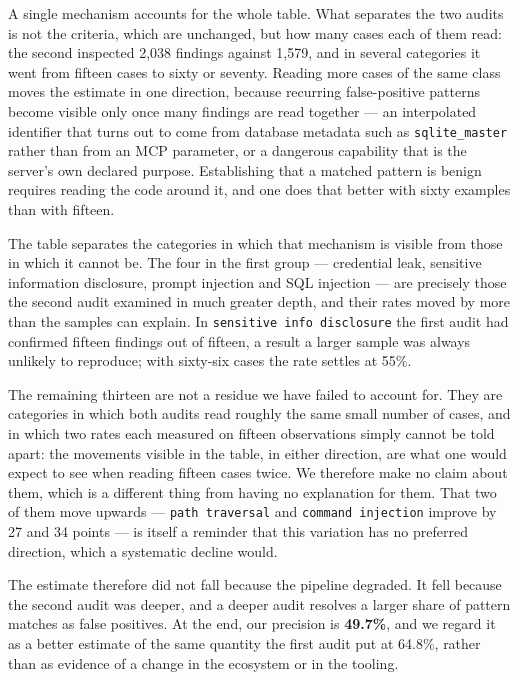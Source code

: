 A single mechanism accounts for the whole table. What separates the two audits is
not the criteria, which are unchanged, but how many cases each of them read: the
second inspected 2,038 findings against 1,579, and in several categories it went
from fifteen cases to sixty or seventy. Reading more cases of the same class moves
the estimate in one direction, because recurring false-positive patterns become
visible only once many findings are read together --- an interpolated identifier
that turns out to come from database metadata such as \texttt{sqlite\_master}
rather than from an MCP parameter, or a dangerous capability that is the server's
own declared purpose. Establishing that a matched pattern is benign requires
reading the code around it, and one does that better with sixty examples than with
fifteen.

The table separates the categories in which that mechanism is visible from those
in which it cannot be. The four in the first group --- credential leak, sensitive
information disclosure, prompt injection and SQL injection --- are precisely those
the second audit examined in much greater depth, and their rates moved by more
than the samples can explain. In \texttt{sensitive info disclosure} the first audit
had confirmed fifteen findings out of fifteen, a result a larger sample was always
unlikely to reproduce; with sixty-six cases the rate settles at 55\%.

The remaining thirteen are not a residue we have failed to account for. They are
categories in which both audits read roughly the same small number of cases, and
in which two rates each measured on fifteen observations simply cannot be told
apart: the movements visible in the table, in either direction, are what one would
expect to see when reading fifteen cases twice. We therefore make no claim about
them, which is a different thing from having no explanation for them. That two of
them move upwards --- \texttt{path traversal} and \texttt{command injection}
improve by 27 and 34 points --- is itself a reminder that this variation has no
preferred direction, which a systematic decline would.

The estimate therefore did not fall because the pipeline degraded. It fell because
the second audit was deeper, and a deeper audit resolves a larger share of pattern
matches as false positives. At the end, our precision is \textbf{49.7\%}, and we
regard it as a better estimate of the same quantity the first audit put at 64.8\%,
rather than as evidence of a change in the ecosystem or in the tooling.

